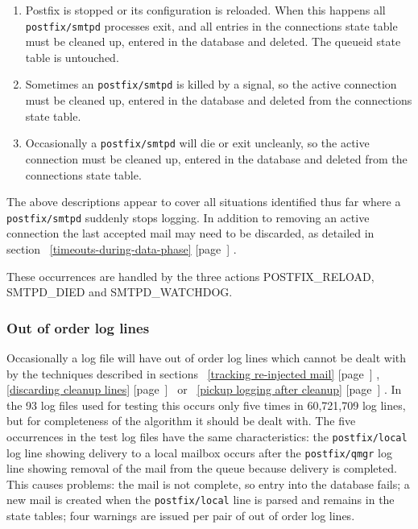 \documentclass[a4paper,12pt,draft]{article}
\newcommand{\refwithpage}[1]{%
    \empty{}\ref{#1} [page~\pageref{#1}]%
}
\newcommand{\daemon}[1]{%
    \texttt{postfix/#1}%
}
\begin{document}
\begin{enumerate}

    \item Postfix is stopped or its configuration is reloaded.  When this
        happens all \daemon{smtpd} processes exit, and all entries in the
        connections state table must be cleaned up, entered in the database
        and deleted.  The queueid state table is untouched.

    \item Sometimes an \daemon{smtpd} is killed by a signal, so the active
        connection must be cleaned up, entered in the database and deleted
        from the connections state table.

    \item Occasionally a \daemon{smtpd} will die or exit uncleanly, so the
        active connection must be cleaned up, entered in the database and
        deleted from the connections state table.

\end{enumerate}

The above descriptions appear to cover all situations identified thus far
where a \daemon{smtpd} suddenly stops logging.  In addition to removing an
active connection the last accepted mail may need to be discarded, as
detailed in section~\refwithpage{timeouts-during-data-phase}.

These occurrences are handled by the three actions POSTFIX\_RELOAD,
SMTPD\_DIED and SMTPD\_WATCHDOG\@.

\subsubsection{Out of order log lines}

\label{out of order log lines}

Occasionally a log file will have out of order log lines which cannot be
dealt with by the techniques described in sections~\refwithpage{tracking
re-injected mail},~\refwithpage{discarding cleanup
lines}~or~\refwithpage{pickup logging after cleanup}.  In the 93 log files
used for testing this occurs only five times in 60,721,709 log lines, but
for completeness of the algorithm it should be dealt with.  The five
occurrences in the test log files have the same characteristics: the
\daemon{local} log line showing delivery to a local mailbox occurs after
the \daemon{qmgr} log line showing removal of the mail from the queue
because delivery is completed.  This causes problems: the mail is not
complete, so entry into the database fails; a new mail is created when the
\daemon{local} line is parsed and remains in the state tables; four
warnings are issued per pair of out of order log lines.
\end{document}
